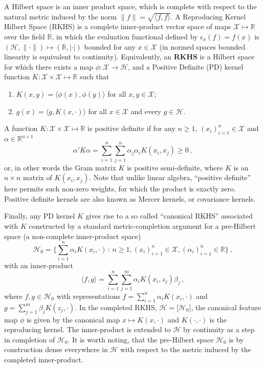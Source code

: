 \documentclass[a4paper,14pt]{extarticle}
\newcommand{\Hcal}{\mathcal{H}}
\newcommand{\Xcal}{\mathcal{X}}
\newcommand{\Real}{\mathbb{R}}
\begin{document}
A Hilbert space is an inner product space, which is complete with respect to the
natural metric induced by the norm $ \|f\| = \sqrt{\langle f, f\rangle} $. A Reproducing
Kernel Hilbert Space (RKHS) is a complete inner-product vector space of maps $\Xcal
\mapsto \Real$ over the field $\Real$, in which the evaluation functional defined
by $\epsilon_x(f) = f(x)$ is $(\Hcal, \|\cdot\|) \mapsto (\Real, |\cdot|)$ bounded
for any $x\in \Xcal$ (in normed spaces bounded linearity is equivalent to continuity).
Equivalently, an \textbf{RKHS} is a Hilbert space for which there exists a map
$\phi:\Xcal\to\Hcal$, and a Positive Definite (PD) kernel function
$K:\Xcal \times \Xcal \mapsto \Real$ such that \begin{enumerate}
  \item $K(x,y) = \langle \phi(x), \phi(y) \rangle$ for all $x, y\in \Xcal$;
  \item $g(x) = \langle g, K(x, \cdot)\rangle$ for all $x\in \Xcal$ and every
  $g\in \Hcal$.
\end{enumerate}
A function $K:\Xcal \times \Xcal \mapsto \Real$ is positive definite if for any
$n\geq1$, $(x_i)_{i=1}^n \in \Xcal$ and $\alpha \in \Real^{n\times 1}$
\begin{equation*}
  \alpha'K\alpha
    = \sum_{i=1}^n \sum_{j=1}^n \alpha_j \alpha_i K(x_i, x_j)
    \geq 0
    \,,
\end{equation*}
or, in other words the Gram matrix $K$ is positive semi-definite, where $K$ is an
$n \times n$ matrix of $K(x_i, x_j)$. Note that unlike linear algebra, ``positive
definite'' here permits such non-zero weights, for which the product is exactly
zero. Positive definite kernels are also known as Mercer kernels, or covariance
kernels.

Finally, any PD kernel $K$ gives rise to a so called ``canonical RKHS'' associated
with $K$ constructed by a standard metric-completion argument for a pre-Hilbert
space (a non-complete inner-product space)
\begin{equation*}
\Hcal_0
  = \bigl\{
    \sum_{i=1}^n \alpha_i K(x_i, \cdot)
    \,:\, n\geq1, (x_i)_{i=1}^n \in \Xcal, (\alpha_i)_{i=1}^n\in \Real
  \bigr\} \,,
\end{equation*}
with an inner-product 
\begin{equation*}
  \langle f, g \rangle = \sum_{i=1}^n \sum_{j=1}^m \alpha_i K(x_i, z_j) \beta_j \,,
\end{equation*}
where $f, g\in \Hcal_0$ with representations $f = \sum_{i=1}^n \alpha_i K(x_i, \cdot)$
and $g = \sum_{j=1}^m \beta_j K(z_j, \cdot)$. In the completed RKHS, $\Hcal = \bigl[\Hcal_0\bigr]$,
the canonical feature map $\phi$ is given by the canonical map $x\mapsto K(x, \cdot)$
and $K(\cdot, \cdot)$ is the reproducing kernel. The inner-product is extended to
$\Hcal$ by continuity as a step in completion of $\Hcal_0$. It is worth noting, that
the pre-Hilbert space $\Hcal_0$ is by construction dense everywhere in $\Hcal$ with
respect to the metric induced by the completed inner-product.
\end{document}
